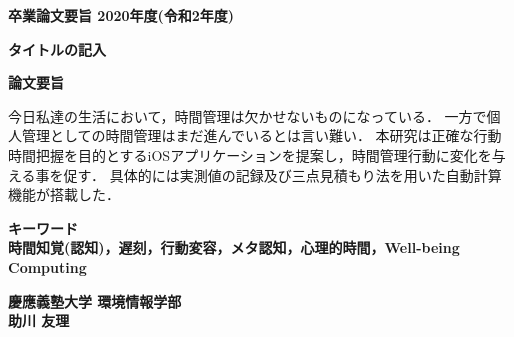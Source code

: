 \begin{center}
\textbf{\Large 卒業論文要旨 2020年度(令和2年度)}

\vspace{6.18mm}

\textbf{\Large タイトルの記入}
\end{center}

\vspace{10mm}

\begin{flushleft}
\textbf{論文要旨}\\
\end{flushleft}
今日私達の生活において，時間管理は欠かせないものになっている．
一方で個人管理としての時間管理はまだ進んでいるとは言い難い．
本研究は正確な行動時間把握を目的とするiOSアプリケーションを提案し，時間管理行動に変化を与える事を促す．
具体的には実測値の記録及び三点見積もり法を用いた自動計算機能が搭載した．




\begin{flushleft}
\textbf{キーワード}\\
\textbf{時間知覚(認知)，遅刻，行動変容，メタ認知，心理的時間，Well-being Computing}

\end{flushleft}

\begin{flushright}
\textbf{慶應義塾大学 環境情報学部}\\
\textbf{助川 友理}
\end{flushright}
\newpage

